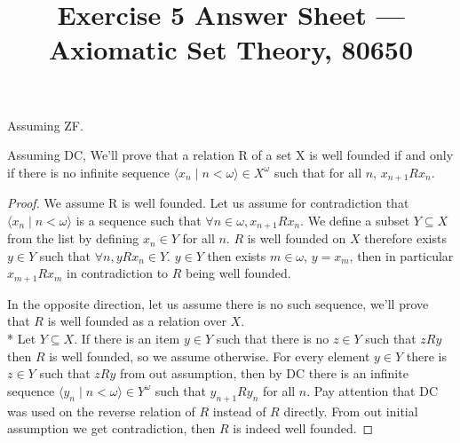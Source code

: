 
\title{Exercise 5 Answer Sheet --- Axiomatic Set Theory, 80650}


\maketitle
\maketitleprint{}

\question{}
Assuming ZF.\@

\subquestion{}
Assuming DC, We'll prove that a relation R of a set X is well founded if and only if there is no infinite sequence $\langle x_n \mid n < \omega \rangle \in X^\omega$ such that for all $n$, $x_{n + 1} R x_n$.
\begin{proof}
	We assume R is well founded.
	Let us assume for contradiction that $\langle x_n \mid n < \omega \rangle$ is a sequence such that $\forall n \in \omega, x_{n + 1} R x_n$.
	We define a subset $Y \subseteq X$ from the list by defining $x_n \in Y$ for all $n$. $R$ is well founded on $X$ therefore exists $y \in Y$ such that $\forall n, y R x_n \in Y$.
	$y \in Y$ then exists $m \in \omega$, $y = x_m$, then in particular $x_{m + 1} R x_m$ in contradiction to $R$ being well founded.

	In the opposite direction, let us assume there is no such sequence, we'll prove that $R$ is well founded as a relation over $X$. \\*
	Let $Y \subseteq X$. If there is an item $y \in Y$ such that there is no $z \in Y$ such that $z R y$ then $R$ is well founded, so we assume otherwise.
	For every element $y \in Y$ there is $z \in Y$ such that $z R y$ from out assumption, then by DC there is an infinite sequence $\langle y_n \mid n < \omega \rangle \in Y^\omega$ such that $y_{n + 1} R y_n$ for all $n$.
	Pay attention that DC was used on the reverse relation of $R$ instead of $R$ directly.
	From out initial assumption we get contradiction, then $R$ is indeed well founded.
\end{proof}


